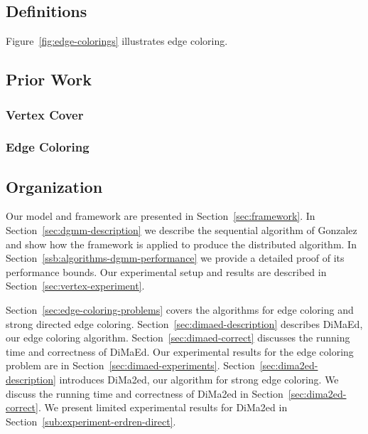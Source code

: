 \documentclass[twoside]{article}
\begin{document}
\subsection{Definitions}






Figure~\ref{fig:edge-colorings} illustrates edge coloring.

\subsection{Prior Work}
\subsubsection{Vertex Cover}



\subsubsection{Edge Coloring}



\subsection{Organization}

Our model and framework are presented in Section~\ref{sec:framework}. In Section~\ref{sec:dgmm-description} we describe the sequential algorithm of Gonzalez and show how the framework is applied to produce the distributed algorithm. In Section~\ref{ssb:algorithms-dgmm-performance} we provide a detailed proof of its performance bounds. Our experimental setup and results are described in Section~\ref{sec:vertex-experiment}.

Section~\ref{sec:edge-coloring-problems} covers the algorithms for edge coloring and strong directed edge coloring. Section~\ref{sec:dimaed-description} describes DiMaEd, our edge coloring algorithm. Section~\ref{sec:dimaed-correct} discusses the running time and correctness of DiMaEd. Our experimental results for the edge coloring problem are in Section~\ref{sec:dimaed-experiments}. Section~\ref{sec:dima2ed-description} introduces DiMa2ed, our algorithm for strong edge coloring. We discuss the running time and correctness of DiMa2ed in Section~\ref{sec:dima2ed-correct}. We present limited experimental results for DiMa2ed in Section~\ref{sub:experiment-erdren-direct}.
\end{document}
